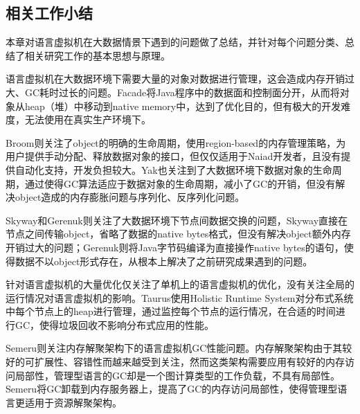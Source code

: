 \documentclass[lang=cn,12pt,a4paper,cite=authoryear]{elegantpaper}
\begin{document}
\subsection{相关工作小结}
本章对语言虚拟机在大数据情景下遇到的问题做了总结，并针对每个问题分类、总结了相关研究工作的基本思想与原理。

语言虚拟机在大数据环境下需要大量的对象对数据进行管理，这会造成内存开销过大、GC耗时过长的问题。Facade将Java程序中的数据面和控制面分开，从而将对象从heap（堆）中移动到native memory中，达到了优化目的，但有极大的开发难度，无法使用在真实生产环境下。

Broom则关注了object的明确的生命周期，使用region-based的内存管理策略，为用户提供手动分配、释放数据对象的接口，但仅仅适用于Naiad开发者，且没有提供自动化支持，开发负担较大。Yak\cite{DBLP:conf/osdi/NguyenFXDLAM16}也关注到了大数据环境下数据对象的生命周期，通过使得GC算法适应于数据对象的生命周期，减小了GC的开销，但没有解决object造成的内存膨胀问题与序列化、反序列化问题。

Skyway和Gerenuk则关注了大数据环境下节点间数据交换的问题，Skyway直接在节点之间传输object，省略了数据的native bytes格式，但没有解决object额外内存开销过大的问题；Gerenuk则将Java字节码编译为直接操作native bytes的语句，使得数据不以object形式存在，从根本上解决了之前研究成果遇到的问题。

针对语言虚拟机的大量优化仅关注了单机上的语言虚拟机的优化，没有关注全局的运行情况对语言虚拟机的影响。Taurus使用Holistic Runtime System对分布式系统中每个节点上的heap进行管理，通过监控每个节点的运行情况，在合适的时间进行GC，使得垃圾回收不影响分布式应用的性能。

Semeru则关注内存解聚架构下的语言虚拟机GC性能问题。内存解聚架构由于其较好的可扩展性、容错性而越来越受到关注，然而这类架构需要应用有较好的内存访问局部性，管理型语言的GC却是一个图计算类型的工作负载，不具有局部性。Semeru将GC卸载到内存服务器上，提高了GC的内存访问局部性，使得管理型语言更适用于资源解聚架构。
\end{document}
